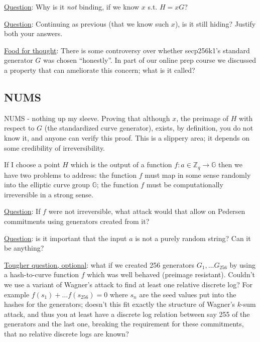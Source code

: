 \documentclass[10pt,a4paper]{article}
\begin{document}
\underline{Question}: Why is it \emph{not} binding, if we know $x$ s.t. $H = xG$?

\vspace{5 pt}

\underline{Question}: Continuing as previous (that we know such $x$), is it still hiding? Justify both your answers.

\vspace{5 pt}

\underline{Food for thought}: There is some controversy over whether secp256k1's standard generator $G$ was chosen ``honestly''. In part of our online prep course we discussed a property that can ameliorate this concern; what is it called?

\subsection{NUMS}

NUMS - nothing up my sleeve. Proving that although $x$, the preimage of $H$ with respect to $G$ (the standardized curve generator), exists, by definition, you do not know it, and anyone can verify this proof. This is a slippery area; it depends on some credibility of irreversibility.

\vspace{5 pt}

If I choose a point $H$ which is the output of a function $f: a \in \mathbb{Z}_q \rightarrow \mathbb{G}$ then we have two problems to address: the function $f$ must map in some sense randomly into the elliptic curve group $\mathbb{G}$; the function $f$ must be computationally irreversible in a strong sense.

\vspace{5 pt}

\underline{Question}: If $f$ were not irreversible, what attack would that allow on Pedersen commitments using generators created from it?

\vspace{5 pt}

\underline{Question}: is it important that the input $a$ is not a purely random string? Can it be anything?

\vspace{5 pt}

\underline{Tougher question, optional}: what if we created 256 generators $G_1, \ldots G_{256}$ by using a hash-to-curve function $f$ which was well behaved (preimage resistant). Couldn't we use a variant of Wagner's attack to find at least one relative discrete log? For example $f(s_1) + \ldots f(s_{256}) = 0$ where $s_n$ are the seed values put into the hashes for the generators; doesn't this fit exactly the structure of Wagner's $k$-sum attack, and thus you at least have a discrete log relation between say 255 of the generators and the last one, breaking the requirement for these commitments, that no relative discrete logs are known?
\end{document}
